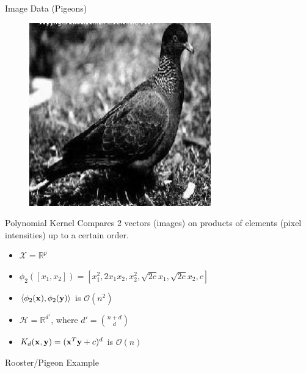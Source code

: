 \documentclass{beamer}
\begin{document}
\begin{frame}{Image Data (Pigeons)}
\begin{figure}
    \includegraphics[scale=.35]{pigeonrs-image_0004.jpg}
  \end{figure}
\end{frame}

\begin{frame}{Polynomial Kernel}
  Compares 2 vectors (images) on products of elements (pixel intensities)
  up to a certain order.
  \begin{itemize}
    \item $\mathcal{X} = \mathbb{R}^{p}$ \pause
    \item $\phi_2 ([x_1, x_2]) = [x_1^2,  2x_1x_2,  x_2^2, \sqrt{2c}x_1, \sqrt{2c}x_2, c]$ \pause
    \item $\langle \phi_2({\bf x}), \phi_2({\bf y}) \rangle$ is $\mathcal{O}(n^2)$ \pause
    \item $\mathcal{H} = \mathbb{R}^{d'}$, where $d' = \binom{n+d}{d}$ \pause
    \item $K_d({\bf x},{\bf y}) = ({\bf x}^T {\bf y}  + c)^d$ is $\mathcal{O}(n)$
  \end{itemize}
\end{frame}

\begin{frame}{Rooster/Pigeon Example}
  \begin{center}
    \resizebox{10.0cm}{!}{
      
    }
  \end{center}
\end{frame}
\end{document}

